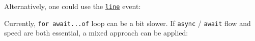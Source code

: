 Alternatively, one could use the
\hyperref[event-line]{\texttt{\textquotesingle{}line\textquotesingle{}}}
event:

\begin{Shaded}
\begin{Highlighting}[]
\OperatorTok{=} \NormalTok{(}\NormalTok{)}\OperatorTok{;}
\OperatorTok{=} \NormalTok{(}\NormalTok{)}\OperatorTok{;}

\OperatorTok{=}\NormalTok{(\{}
  \OperatorTok{:}\NormalTok{(}\NormalTok{)}\OperatorTok{,}
  \OperatorTok{:} \OperatorTok{,}
\NormalTok{\})}\OperatorTok{;}

\NormalTok{(}\OperatorTok{,}\KeywordTok{=\textgreater{}}\NormalTok{ \{}
  \NormalTok{(}\SpecialCharTok{$\{}\SpecialCharTok{\}}\VerbatimStringTok{\textasciigrave{}}\NormalTok{)}\OperatorTok{;}
\NormalTok{\})}\OperatorTok{;}
\end{Highlighting}
\end{Shaded}

Currently, \texttt{for\ await...of} loop can be a bit slower. If
\texttt{async} / \texttt{await} flow and speed are both essential, a
mixed approach can be applied:

